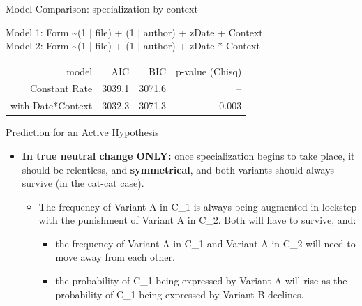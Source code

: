 \documentclass[hyperref={pdfpagelabels=false}]{beamer}
\begin{document}
\begin{frame}{Model Comparison: specialization by context}

\begin{center}
Model 1: Form \textasciitilde  (1 | file) + (1 | author) + zDate + Context\\
\vspace*{1mm}
Model 2: Form \textasciitilde  (1 | file) + (1 | author) + zDate{  }*{  }Context\\
\vspace*{4mm}

	\begin{tabular}{rrrr}
\toprule
	model & AIC & BIC & p-value (Chisq)\\
	\cmidrule{2-4}
Constant Rate & 3039.1 & 3071.6 & -- \\
with Date*Context &  3032.3 & 3071.3 & 0.003\\
\bottomrule
\end{tabular}
\end{center}
\end{frame}



\begin{frame}{Prediction for an Active Hypothesis}
		\begin{itemize}
			\item[] \textbf{In true neutral change ONLY:} once specialization begins to take place, it should be relentless, and \textbf{symmetrical}, and both variants should always survive (in the cat-cat case).
				\begin{itemize}
					\item The frequency of Variant A in C_1 is always being augmented in lockstep with the punishment of Variant A in C_2. Both will have to survive, and:
					\begin{itemize}
					\item[\textbf{Corollary 1:}] the frequency of Variant A in C_1 and Variant A in C_2 will need to move away from each other.
					\item[\textbf{Corollary 2:}] the probability of C_1 being expressed by Variant A will rise as the probability of C_1 being expressed by Variant B declines.
					\end{itemize}
				\end{itemize}
		\end{itemize}
\end{frame}
\end{document}
